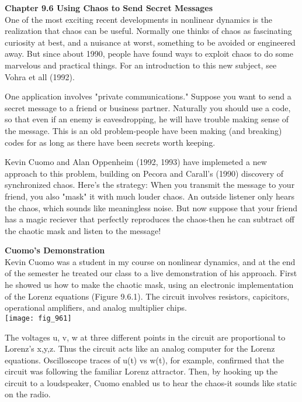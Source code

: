 \documentclass{article}
\newcommand\tab[1][1cm]{\hspace*{#1}}
\begin{document}
\textbf {Chapter 9.6 Using Chaos to Send Secret Messages} \\
One of the most exciting recent developments in nonlinear dynamics is the realization that chaos can be useful. Normally one thinks of chaos as fascinating curiosity at best, and a nuisance at worst, something to be avoided or engineered away. But since about 1990, people have found ways to exploit chaos to do some marvelous and practical things. For an introduction to this new subject, see Vohra et all (1992). \\ \tab

One application involves "private communications." Suppose you want to send a secret message to a friend or business partner. Naturally you should use a code, so that even if an enemy is eavesdropping, he will have trouble making sense of the message. This is an old problem-people have been making (and breaking) codes for as long as there have been secrets worth keeping. \\ \tab

Kevin Cuomo and Alan Oppenheim (1992, 1993) have implemeted a new approach to this problem, building on Pecora and Carall's (1990) discovery of synchronized chaos. Here's the strategy: When you transmit the message to your friend, you also "mask" it with much louder chaos. An outside listener only hears the chaos, which sounds like meaningless noise. But now suppose that your friend has a magic reciever that perfectly reproduces the chaos-then he can subtract off the chaotic mask and listen to the message! 

\textbf {Cuomo's Demonstration} \\ \tab
Kevin Cuomo was a student in my course on nonlinear dynamics, and at the end of the semester he treated our class to a live demonstration of his approach. First he showed us how to make the chaotic mask, using an electronic implementation of the Lorenz equations (Figure 9.6.1). The circuit involves resistors, capicitors, operational amplifiers, and analog multiplier chips. \\

\texttt{[image: fig\_961]}

The voltages u, v, w at three different points in the circuit are proportional to Lorenz's x,y,z. Thus the circuit acts like an analog computer for the Lorenz equations. Oscilloscope traces of u(t) vs w(t), for example, confirmed that the circuit was following the familiar Lorenz attractor. Then, by hooking up the circuit to a loudspeaker, Cuomo enabled us to hear the chaos-it sounds like static on the radio. \\ \tab
\end{document}
